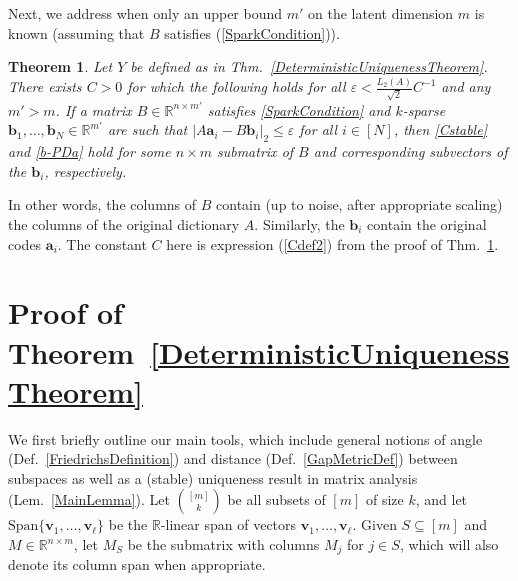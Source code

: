 \documentclass[journal, twocolumn]{IEEEtran}
\newtheorem{theorem}{Theorem}
\begin{document}
Next, we address when only an upper bound $m'$ on the latent dimension $m$ is known (assuming that $B$ satisfies (\ref{SparkCondition})). 

\begin{theorem}\label{DeterministicUniquenessTheorem2}
Let $Y$ be defined as in Thm.~\ref{DeterministicUniquenessTheorem}. There exists $C > 0$ for which the following holds for all $\varepsilon < \frac{L_2(A)}{\sqrt{2}}C^{-1}$ and any $m' > m$. If a matrix $B \in \mathbb{R}^{n \times m'}$ satisfies \eqref{SparkCondition} and $k$-sparse $\mathbf{b}_1, \ldots, \mathbf{b}_N \in \mathbb{R}^{m'}$ are such that \mbox{$|A\mathbf{a}_i - B\mathbf{b}_i|_2 \leq \varepsilon$} for all $i \in [N]$, then \eqref{Cstable} and \eqref{b-PDa} hold for some $n \times m$ submatrix of $B$ and corresponding subvectors of the $\mathbf{b}_i$, respectively. 
\end{theorem}

In other words, the columns of $B$ contain (up to noise, after appropriate scaling) the columns of the original dictionary $A$. Similarly, the $\mathbf{b}_i$ contain the original codes $\mathbf{a}_i$. The constant $C$ here is expression (\ref{Cdef2}) from the proof of Thm.~\ref{DeterministicUniquenessTheorem2}. 


\vspace{-.08 cm}

\section{Proof of Theorem~\ref{DeterministicUniquenessTheorem}}\label{DUT}
We first briefly outline our main tools, which include general notions of angle (Def.~\ref{FriedrichsDefinition}) and distance (Def.~\ref{GapMetricDef}) between subspaces as well as a (stable) uniqueness result in matrix analysis (Lem.~\ref{MainLemma}).
Let ${[m] \choose k}$ be all subsets of $[m]$ of size $k$, and let $\text{Span}\{\mathbf{v}_1, \ldots, \mathbf{v}_\ell\}$ be the $\mathbb{R}$-linear span of vectors $\mathbf{v}_1, \ldots, \mathbf{v}_\ell$. Given $S \subseteq [m]$ and $M \in \mathbb{R}^{n \times m}$, let $M_S$ be the submatrix with columns $M_j$ for $j \in S$, which will also denote its column span when appropriate.  
\end{document}
